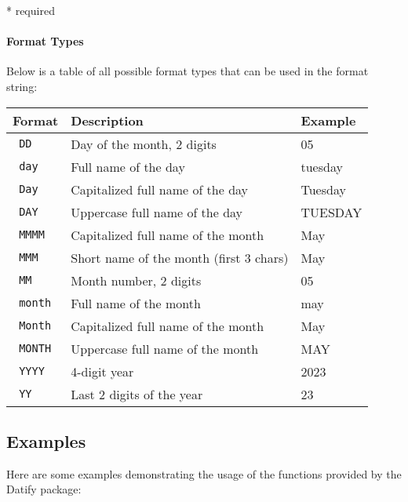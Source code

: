 * required

\paragraph{Format Types}\label{format-types}

Below is a table of all possible format types that can be used in the
format string:

\begin{longtable}[]{@{}lll@{}}
\toprule\noalign{}
Format & Description & Example \\
\midrule\noalign{}
\endhead
\bottomrule\noalign{}
\endlastfoot
\texttt{\ DD\ } & Day of the month, 2 digits & 05 \\
\texttt{\ day\ } & Full name of the day & tuesday \\
\texttt{\ Day\ } & Capitalized full name of the day & Tuesday \\
\texttt{\ DAY\ } & Uppercase full name of the day & TUESDAY \\
\texttt{\ MMMM\ } & Capitalized full name of the month & May \\
\texttt{\ MMM\ } & Short name of the month (first 3 chars) & May \\
\texttt{\ MM\ } & Month number, 2 digits & 05 \\
\texttt{\ month\ } & Full name of the month & may \\
\texttt{\ Month\ } & Capitalized full name of the month & May \\
\texttt{\ MONTH\ } & Uppercase full name of the month & MAY \\
\texttt{\ YYYY\ } & 4-digit year & 2023 \\
\texttt{\ YY\ } & Last 2 digits of the year & 23 \\
\end{longtable}

\subsection{Examples}\label{examples}

Here are some examples demonstrating the usage of the functions provided
by the Datify package:

\begin{Shaded}
\begin{Highlighting}[]



\end{Highlighting}
\end{Shaded}

